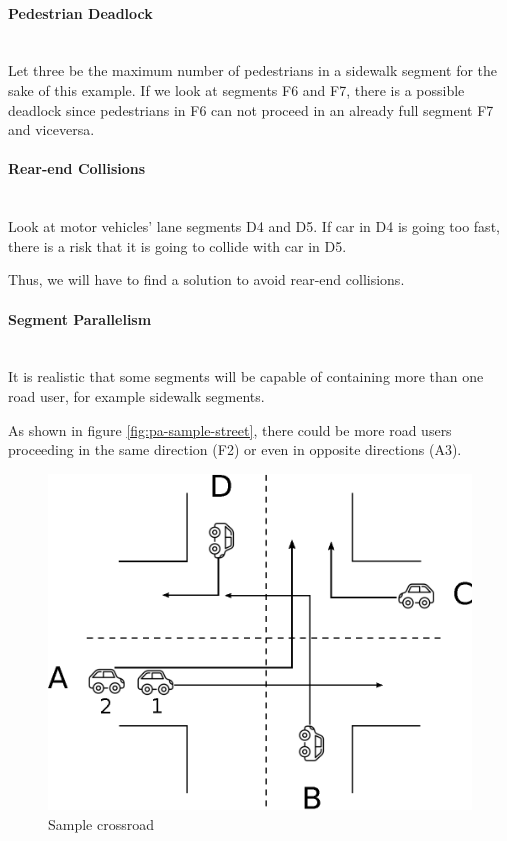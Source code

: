 \paragraph{Pedestrian Deadlock} \mbox{} \\

Let three be the maximum number of pedestrians in a sidewalk segment for the
sake of this example.
If we look at segments F6 and F7, there is a possible deadlock since
pedestrians in F6 can not proceed in an already full segment F7 and viceversa.

\paragraph{Rear-end Collisions} \mbox{} \\

Look at motor vehicles' lane segments D4 and D5. If car in D4 is going too
fast, there is a risk that it is going to collide with car in D5.

Thus, we will have to find a solution to avoid rear-end collisions.

\paragraph{Segment Parallelism} \mbox{} \\

It is realistic that some segments will be capable of containing more than one
road user, for example sidewalk segments.

As shown in figure \ref{fig:pa-sample-street}, there could be more road users
proceeding in the same direction (F2) or even in opposite directions (A3).


\begin{figure}[H]
  \centering
  \includegraphics[width=.6\columnwidth]{images/analysis/crossroads.eps}
  \caption{Sample crossroad}
  \label{fig:pa-sample-crossroad}
\end{figure}


